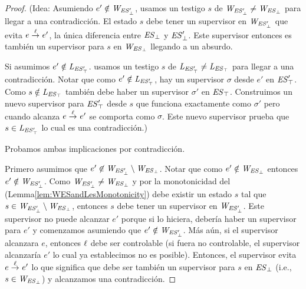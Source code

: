\begin{proof}
	(Idea: Asumiendo $e' \notin \mathit{W_{\mathit{\mathit{ES}'_{\bot}}}}$, usamos un testigo $s$ de $\mathit{W_{\mathit{\mathit{ES}'_{\bot}}}} \neq 
	\mathit{W_{\mathit{\mathit{ES}_{\bot}}}}$ para llegar a una contradicción. El estado $s$ debe tener un supervisor en 
	$\mathit{W_{\mathit{\mathit{ES}'_{\bot}}}}$ que evita $e \overset{\ell}{\rightarrow}_{} e'$, la única diferencia entre $\mathit{\mathit{ES}_{\bot}}$ y $\mathit{\mathit{ES}'_{\bot}}$. Este supervisor entonces es también un supervisor para $s$ en $\mathit{W_{\mathit{\mathit{ES}_{\bot}}}}$ llegando a un absurdo. 
	
	Si asumimos $e' \notin \mathit{L_{\mathit{\mathit{ES}'_{\top}}}}$.  usamos un testigo $s$ de $\mathit{L_{\mathit{\mathit{ES}'_{\top}}}} \neq \mathit{L_{\mathit{\mathit{ES}_{\top}}}}$ para llegar a una contradicción. Notar que como $e' \notin \mathit{L_{\mathit{\mathit{ES}'_{\top}}}}$, hay un supervisor $\sigma$ desde $e'$ en  
	$\mathit{\mathit{ES}'_{\top}}$. Como $s \notin \mathit{L_{\mathit{\mathit{ES}_{\top}}}}$ también debe haber un supervisor $\sigma'$ en $\mathit{\mathit{ES}_{\top}}$. Construimos un nuevo supervisor para $\mathit{\mathit{ES}'_{\top}}$ desde $s$ que funciona exactamente como $\sigma'$ pero cuando alcanza $e \overset{\ell}{\rightarrow}_{} e'$ se comporta como $\sigma$. Este nuevo supervisor prueba que $s \in \mathit{L_{\mathit{\mathit{ES}'_{\top}}}}$ lo cual es una contradicción.)


Probamos ambas implicaciones por contradicción. 

Primero asumimos que $e' \not \in 
\mathit{W_{\mathit{\mathit{ES}'_{\bot}}}} \setminus \mathit{W_{\mathit{\mathit{ES}_{\bot}}}}$. Notar que como $e' \notin \mathit{W_{\mathit{\mathit{ES}_{\bot}}}}$ entonces $e' \notin \mathit{W_{\mathit{\mathit{ES}'_{\bot}}}}$. Como $\mathit{W_{\mathit{\mathit{ES}'_{\bot}}}} \neq \mathit{W_{\mathit{\mathit{ES}_{\bot}}}}$ y por la monotonicidad del (Lemma\ref{lem:WESandLesMonotonicity}) debe existir un estado $s$ tal que $s \in \mathit{W_{\mathit{\mathit{ES}'_{\bot}}}} \setminus 
\mathit{W_{\mathit{\mathit{ES}_{\bot}}}}$, entonces $s$ debe tener un supervisor en $\mathit{W_{\mathit{\mathit{ES}'_{\bot}}}} $. Este supervisor no puede alcanzar $e'$ porque si lo hiciera, debería haber un supervisor para $e'$ y comenzamos asumiendo que $e' 
\notin \mathit{W_{\mathit{\mathit{ES}'_{\bot}}}}$. Más aún, si el supervisor alcanzara $e$, entonces $\ell$ debe ser controlable (si fuera no controlable, el supervisor alcanzaría $e'$ lo cual ya establecimos no es posible). Entonces, el supervisor evita $e \overset{\ell}{\rightarrow}_{} e'$ lo que significa que debe ser también un supervisor para $s$ en $\mathit{\mathit{ES}_{\bot}}$ (i.e.,  $s \in \mathit{W_{\mathit{\mathit{ES}_{\bot}}}}$) y alcanzamos una contradicción.


\end{proof}
